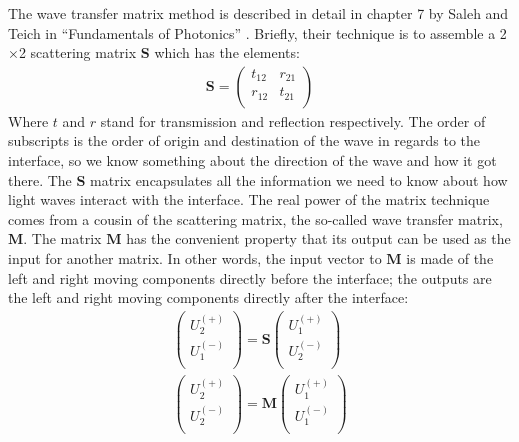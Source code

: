 \documentclass[osajnl,preprint,showpacs,superscriptaddress,12pt]{revtex4-1} %
\begin{document}
The wave transfer matrix method is described in detail in chapter 7 by Saleh and Teich in ``Fundamentals of Photonics'' \cite{2007fuph.book.....S}.  Briefly, their technique is to assemble a 2$\times$2 scattering matrix $\boldsymbol{S}$ which has the elements:
\begin{eqnarray}
\boldsymbol{S} = \left(
\begin{array}{cc}
 t_{12} & r_{21} \\
 r_{12} & t_{21} \\
\end{array}
\right)
\end{eqnarray}
Where $t$ and $r$ stand for transmission and reflection respectively.  The order of subscripts is the order of origin and destination of the wave in regards to the interface, so we know something about the direction of the wave and how it got there.  The $\boldsymbol{S}$ matrix encapsulates all the information we need to know about how light waves interact with the interface.  The real power of the matrix technique comes from a cousin of the scattering matrix, the so-called wave transfer matrix, $\boldsymbol{M}$.  The matrix $\boldsymbol{M}$ has the convenient property that its output can be used as the input for another matrix.  In other words, the input vector to $\boldsymbol{M}$ is made of the left and right moving components directly before the interface; the outputs are the left and right moving components directly after the interface:
\begin{eqnarray}
\left(
\begin{array}{c}
 U_2^{(+)} \\
 U_1^{(-)} \\
\end{array}
\right)=\boldsymbol{S} \left(
\begin{array}{c}
 U_1^{(+)} \\
 U_2^{(-)} \\
\end{array}
\right) \\
\left(
\begin{array}{c}
 U_2^{(+)} \\
 U_2^{(-)} \\
\end{array}
\right)=\boldsymbol{M} \left(
\begin{array}{c}
 U_1^{(+)} \\
 U_1^{(-)} \\
\end{array}
\right)
\end{eqnarray}
\end{document}
